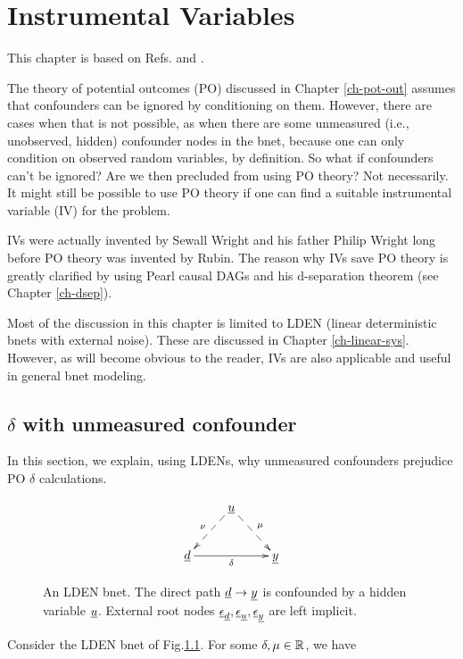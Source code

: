 \chapter{Instrumental Variables}
\label{ch-instrumental}


This chapter is based on
Refs.\cite{book-mixtape} and \cite{wiki-inst-vars}.

The theory of potential outcomes (PO)
discussed in Chapter \ref{ch-pot-out}
assumes that confounders can be ignored
by conditioning on them.
However, there are cases when
that is not possible, as when there are some
unmeasured (i.e., unobserved, hidden)
confounder nodes in the bnet,
because one can
only condition on observed random 
variables, by definition.
So what if confounders can't be ignored?
Are we then precluded from using PO theory?
Not necessarily.
It might still be possible to
use PO theory if one can find a suitable
instrumental variable (IV) for the problem.

IVs were actually invented 
by Sewall Wright and his father Philip
Wright long before
PO theory was invented  by Rubin.
The reason why IVs save PO theory
is greatly clarified by using
Pearl causal DAGs and his d-separation theorem 
(see Chapter \ref{ch-dsep}).

Most of the discussion in this chapter
is  limited to LDEN (linear deterministic
bnets with external noise). These
are discussed in Chapter \ref{ch-linear-sys}.
However, as will become
obvious to the reader, IVs are 
also applicable
and useful
in general bnet modeling.


\section{$\delta$ with unmeasured confounder}

In this section,
we explain, using LDENs,
why
unmeasured confounders 
prejudice PO $\delta$ calculations.

\begin{figure}[h!]
$$
\xymatrix{
&\rvu\ar@{-->}[dl]_\nu\ar@{-->}[dr]^\mu
\\
\rvd\ar[rr]_\delta&&\rvy
}$$
\caption{An LDEN bnet. The direct path ${\underline{d}}\rightarrow{\underline{y}}$
is confounded by
a hidden variable ${\underline{u}}$.
External root nodes $\underline{\epsilon}_{\underline{d}},
\underline{\epsilon}_{\underline{u}}, \underline{\epsilon}_{\underline{y}}$ are left implicit. 
} 
\label{fig-iv-G-start}
\end{figure}

Consider 
the LDEN bnet of Fig.\ref{fig-iv-G-start}.
For some $\delta, \mu\in { \mathbb{R}}$, we have

